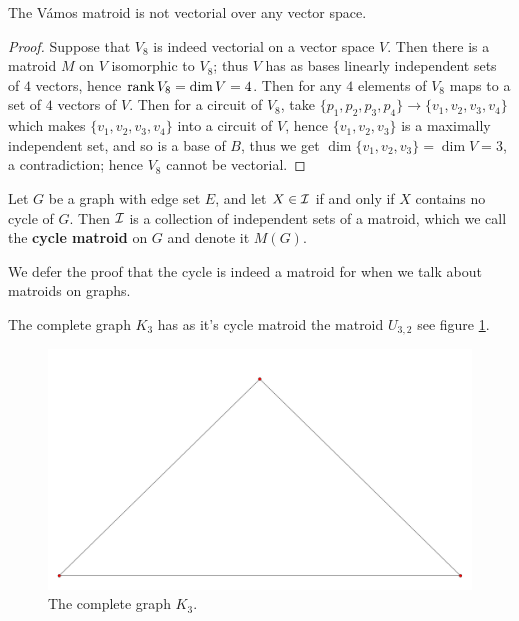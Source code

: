 \begin{proposition}\label{1.2.4}
    The Vámos matroid is not vectorial over any vector space.
\end{proposition}
\begin{proof}
    Suppose that $ V_8$ is indeed vectorial on a vector space $V$. Then there is a matroid $M$ on
    $V$ isomorphic to  $ V_8$; thus $V$ has as bases linearly independent sets of  $4$ vectors,
    hence  $\operatorname{rank}{V_8}=\dim{V}=4$. Then for any $4$ elements of $V_8$ maps to a set of $4$ vectors
    of  $V$. Then for a circuit of $V_8$, take $ \{p_1,p_2,p_3,p_4\} \rightarrow
    \{v_1,v_2,v_3,v_4\}$ which makes $\{v_1,v_2,v_3,v_4\}$ into a circuit of $V$, hence
    $\{v_1,v_2,v_3\}$ is a maximally independent set, and so is a base of $B$, thus we get
    $\dim{\{v_1,v_2,v_3\}}=\dim{V}=3$, a contradiction; hence $ V_8$ cannot be vectorial.
\end{proof}

\begin{definition}
    Let $G$ be a graph with edge set  $E$, and let  $X \in \mathcal{I}$ if and only if  $X$ contains no
    cycle of  $G$. Then  $\mathcal{I}$ is a collection of independent sets of a matroid, which we call the
    \textbf {cycle matroid} on $G$ and denote it  $M(G)$.		
\end{definition}

We defer the proof that the cycle is indeed a matroid for when we talk about matroids on graphs.

\begin{example}
    The complete graph $K_3$ has as it's cycle matroid the matroid  $U_{3,2}$ see figure
    \ref{fig:1.1}.
    \begin{figure}
        \centering
        \includegraphics[scale = 0.3]{Figures/Chapter1/k3cyclemat.png}
        \caption{The complete graph $K_3$.}
        \label{fig:1.1}
    \end{figure}
\end{example} 

